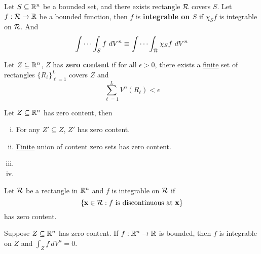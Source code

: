 \documentclass[11pt]{article}
\begin{document}
			\begin{definition}
				Let $S \subseteq \mathbb{R}^n$ be a bounded set, and there exists rectangle $\mathcal{{R}}$ covers $S$. Let $f: \mathcal{{R}} \to \mathbb{R}$ be a bounded function, then $f$ is \textbf{integrable on $S$} if $\chi_S f$ is integrable on $\mathcal{{R}}$. And
				\begin{equation}
					\int \cdots \int_S f\ dV^n \equiv \int \cdots \int_{\mathcal{{R}}} \chi_S f\ dV^n
				\end{equation}
			\end{definition}
			
			\begin{definition}
				Let $Z \subseteq \mathbb{R}^n$, $Z$ has \textbf{zero content} if for all $\epsilon > 0$, there exists a \ul{finite} set of rectangles $\{R_\ell\}_{\ell=1}^L$ covers $Z$ and
				\begin{equation}
					\sum_{\ell=1}^L V^n (R_\ell) < \epsilon
				\end{equation}
			\end{definition}
			
			\begin{proposition}
				Let $Z \subseteq \mathbb{R}^n$ has zero content, then
				\begin{enumerate}[(i)]
					\item For any $Z' \subseteq Z$, $Z'$ has zero content.
					\item \ul{Finite} union of content zero sets has zero content.
					\item {}
					\item {}
				\end{enumerate}
			\end{proposition}
			
			\begin{theorem}
				Let $\mathcal{{R}}$ be a rectangle in $\mathbb{R}^n$ and $f$ is integrable on $\mathcal{{R}}$ if
				\begin{equation}
					\{\textbf{x} \in \mathcal{{R}}: f \text{{ is discontinuous at \textbf{x}}}\}
				\end{equation}
				has zero content.
			\end{theorem}
			
			\begin{proposition}[Folland 4.22]
				Suppose $Z \subseteq \mathbb{R}^n$ has zero content. If $f: \mathbb{R}^n \to \mathbb{R}$ is bounded, then $f$ is integrable on $Z$ and $\int_Z f\ dV^n = 0$.
			\end{proposition}
			
\end{document}
